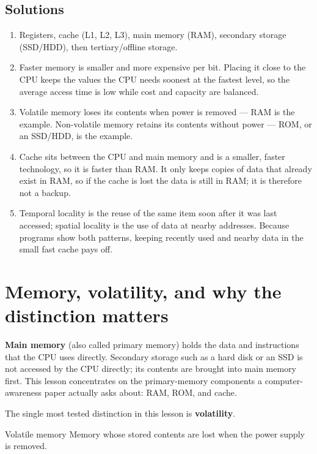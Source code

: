 \subsection*{Solutions}
\begingroup\small
\begin{enumerate}[label=\arabic*.]
  \item Registers, cache (L1, L2, L3), main memory (RAM), secondary storage
    (SSD/HDD), then tertiary/offline storage.
  \item Faster memory is smaller and more expensive per bit. Placing it close
    to the CPU keeps the values the CPU needs soonest at the fastest level,
    so the average access time is low while cost and capacity are balanced.
  \item Volatile memory loses its contents when power is removed --- RAM is
    the example. Non-volatile memory retains its contents without power ---
    ROM, or an SSD/HDD, is the example.
  \item Cache sits between the CPU and main memory and is a smaller, faster
    technology, so it is faster than RAM. It only keeps copies of data that
    already exist in RAM, so if the cache is lost the data is still in RAM;
    it is therefore not a backup.
  \item Temporal locality is the reuse of the same item soon after it was
    last accessed; spatial locality is the use of data at nearby addresses.
    Because programs show both patterns, keeping recently used and nearby
    data in the small fast cache pays off.
\end{enumerate}
\endgroup

\section{Memory, volatility, and why the distinction matters}
\textbf{Main memory} (also called primary memory) holds the data and
instructions that the CPU uses directly. Secondary storage such as a hard
disk or an SSD is not accessed by the CPU directly; its contents are brought
into main memory first. This lesson concentrates on the primary-memory
components a computer-awareness paper actually asks about: RAM, ROM, and
cache.

The single most tested distinction in this lesson is \textbf{volatility}.

\begin{definitionbox}{Volatile memory}
Memory whose stored contents are lost when the power supply is removed.
\end{definitionbox}

